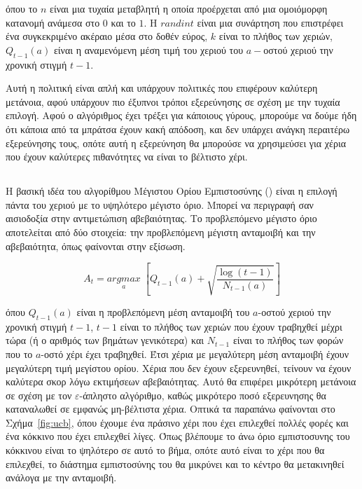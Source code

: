 όπου το $n$ είναι μια τυχαία μεταβλητή η οποία προέρχεται από μια ομοιόμορφη κατανομή ανάμεσα στο $0$ και το $1$. Η $randint$ είναι μια συνάρτηση που επιστρέφει ένα συγκεκριμένο ακέραιο μέσα στο δοθέν εύρος, $k$ είναι το πλήθος των χεριών, $Q_{t-1}(a)$ είναι η αναμενόμενη μέση τιμή του χεριού του $a-$οστού χεριού την χρονική στιγμή $t-1$.

Αυτή η πολιτική είναι απλή και υπάρχουν πολιτικές που επιφέρουν καλύτερη μετάνοια, αφού υπάρχουν πιο έξυπνοι τρόποι εξερεύνησης σε σχέση με την τυχαία επιλογή. Αφού ο αλγόριθμος έχει τρέξει για κάποιους γύρους, μπορούμε να δούμε ήδη ότι κάποια από τα μπράτσα έχουν κακή απόδοση, και δεν υπάρχει ανάγκη περαιτέρω εξερεύνησης τους, οπότε αυτή η εξερεύνηση θα μπορούσε να χρησιμεύσει για χέρια που έχουν καλύτερες πιθανότητες να είναι το βέλτιστο χέρι.

\subsection{}

Η βασική ιδέα του αλγορίθμου Μέγιστου Ορίου Εμπιστοσύνης () είναι η επιλογή πάντα του χεριού με το υψηλότερο μέγιστο όριο. Μπορεί να περιγραφή σαν αισιοδοξία στην αντιμετώπιση αβεβαιότητας. Το προβλεπόμενο μέγιστο όριο αποτελείται από δύο στοιχεία: την προβλεπόμενη μέγιστη ανταμοιβή και την αβεβαιότητα, όπως φαίνονται στην εξίσωση.

\begin{equation}
    A_t = \underset{a}{argmax}\;\left[Q_{t-1}(a) + \sqrt{\frac{\log{(t-1)}}{N_{t-1}(a)}}\right]
\end{equation}

όπου $Q_{t-1}(a)$ είναι η προβλεπόμενη μέση ανταμοιβή του $a$-οστού χεριού την χρονική στιγμή $t-1$, $t-1$ είναι το πλήθος των χεριών που έχουν τραβηχθεί μέχρι τώρα (ή ο αριθμός των βημάτων γενικότερα) και $N_{t-1}$ είναι το πλήθος των φορών που το $a$-οστό χέρι έχει τραβηχθεί. Έτσι χέρια με μεγαλύτερη μέση ανταμοιβή έχουν μεγαλύτερη τιμή μεγίστου ορίου. Χέρια που δεν έχουν εξερευνηθεί, τείνουν να έχουν καλύτερα σκορ λόγω εκτιμήσεων αβεβαιότητας. Αυτό θα επιφέρει μικρότερη μετάνοια σε σχέση με τον $ε$-άπληστο αλγόριθμο, καθώς μικρότερο ποσό εξερευνησης θα καταναλωθεί σε εμφανώς μη-βέλτιστα χέρια. Οπτικά τα παραπάνω φαίνονται στο Σχήμα~\ref{fig:ucb}, όπου έχουμε ένα πράσινο χέρι που έχει επιλεχθεί πολλές φορές και ένα κόκκινο που έχει επιλεχθεί λίγες. Όπως βλέπουμε το άνω όριο εμπιστοσυνης του κόκκινου είναι το ψηλότερο σε αυτό το βήμα, οπότε αυτό είναι το χέρι που θα επιλεχθεί, το διάστημα εμπιστοσύνης του θα μικρύνει και το κέντρο θα μετακινηθεί ανάλογα με την ανταμοιβή.

